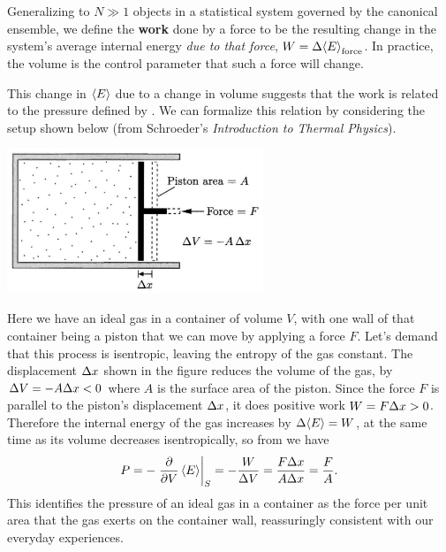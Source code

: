 \begin{shaded}
  Generalizing to $N \gg 1$ objects in a statistical system governed by the canonical ensemble, we define the \textbf{work} done by a force to be the resulting change in the system's average internal energy \textit{due to that force}, $W = \Delta\!\left\langle E \right\rangle_{\text{force}}$.
  In practice, the volume is the control parameter that such a force will change.
\end{shaded}

This change in $\left\langle E \right\rangle$ due to a change in volume suggests that the work is related to the pressure defined by .
We can formalize this relation by considering the setup shown below (from Schroeder's \textit{Introduction to Thermal Physics}). \\[-24 pt]
\begin{center}
  \includegraphics[width=0.575\textwidth]{figs/unit05_piston.pdf} %
\end{center}

Here we have an ideal gas in a container of volume $V$, with one wall of that container being a piston that we can move by applying a force $F$.
Let's demand that this process is isentropic, leaving the entropy of the gas constant.
The displacement $\Delta x$ shown in the figure reduces the volume of the gas, by $\Delta V = -A\Delta x < 0$ where $A$ is the surface area of the piston.
Since the force $F$ is parallel to the piston's displacement $\Delta x$, it does positive work $W = F\Delta x > 0$.
Therefore the internal energy of the gas increases by $\Delta\!\left\langle E \right\rangle = W$, at the same time as its volume decreases isentropically, so from  we have
\begin{equation}
  P = -\left. \frac{\partial }{\partial V} \left\langle E \right\rangle\right|_S = -\frac{W}{\Delta V} = \frac{F\Delta x}{A\Delta x} = \frac{F}{A}.
\end{equation}
This identifies the pressure of an ideal gas in a container as the force per unit area that the gas exerts on the container wall, reassuringly consistent with our everyday experiences.

